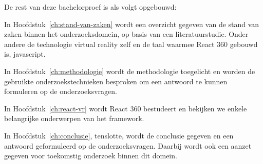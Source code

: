 De rest van deze bachelorproef is als volgt opgebouwd:

In Hoofdstuk~\ref{ch:stand-van-zaken} wordt een overzicht gegeven van de stand van zaken binnen het onderzoeksdomein, op basis van een literatuurstudie. Onder andere de technologie virtual reality zelf en de taal waarmee React 360 gebouwd is, javascript.

In Hoofdstuk~\ref{ch:methodologie} wordt de methodologie toegelicht en worden de gebruikte onderzoekstechnieken besproken om een antwoord te kunnen formuleren op de onderzoeksvragen.

In Hoofdstuk~\ref{ch:react-vr} wordt React 360 bestudeert en bekijken we enkele belangrijke onderwerpen van het framework.

In Hoofdstuk~\ref{ch:conclusie}, tenslotte, wordt de conclusie gegeven en een antwoord geformuleerd op de onderzoeksvragen. Daarbij wordt ook een aanzet gegeven voor toekomstig onderzoek binnen dit domein.

